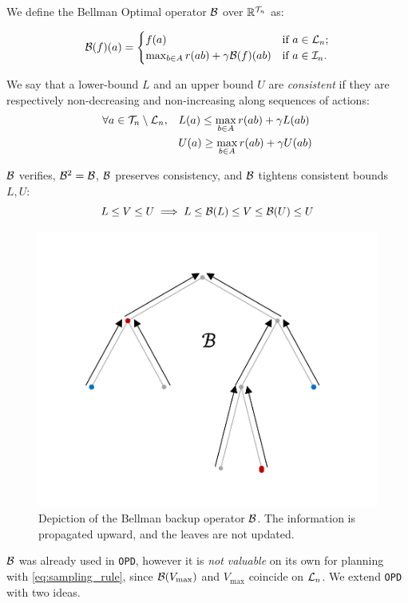 \documentclass{article}
\begin{document}
\begin{definition}
We define the Bellman Optimal operator $\mathcal{B}$ over $\mathbb{R}^{\mathcal{T}_n}$ as:

\begin{equation}
    \mathcal{B}(f)(a) = \begin{cases}
    f(a) & \text{if $a\in\mathcal{L}_n$;} \\
    \max_{b\in A} r(ab) + \gamma \mathcal{B}(f)({ab})
    & \text{if $a\in\mathcal{I}_n$.}
    \end{cases}
\end{equation}
\end{definition}
\begin{definition}
We say that a lower-bound $L$ and an upper bound $U$ are \emph{consistent} if they are respectively non-decreasing and non-increasing along sequences of actions:
\begin{align*}
\forall a\in\mathcal{T}_n\setminus\mathcal{L}_n, \quad &L(a) \leq \max_{b\in A} r(ab) + \gamma L(ab)\\
&U(a) \geq \max_{b\in A} r(ab) + \gamma U(ab)
\end{align*}
\end{definition}

\begin{lemma}
$\mathcal{B}$ verifies, $\mathcal{B}^2=\mathcal{B}$, $\mathcal{B}$ preserves consistency, and $\mathcal{B}$ tightens consistent bounds $L,U$:
\begin{equation*}
    L\leq V \leq U \implies L \leq \mathcal{B}(L) \leq V \leq \mathcal{B}(U) \leq U
\end{equation*}
\end{lemma}

\begin{figure}[H]
	\centering
	\includegraphics[trim={1.8cm 1.4cm 1.9cm 1.9cm}, clip,width=0.4\linewidth]{img/tree_2}
	\caption{Depiction of the Bellman backup operator $\mathcal{B}$. The information is propagated upward, and the leaves are not updated.}
\end{figure}

$\mathcal{B}$ was already used in \texttt{OPD}, however it is \emph{not valuable} on its own for planning with \eqref{eq:sampling_rule}, since  $\mathcal{B}(V_{\max})$ and $V_{\max}$ coincide on $\mathcal{L}_n$.
We extend \texttt{OPD} with two ideas.
\end{document}

